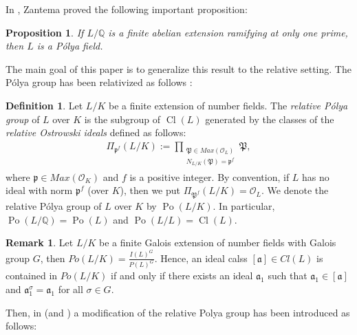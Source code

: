 \documentclass{amsart}
\newtheorem{proposition}[theorem]{Proposition}
\theoremstyle{definition}
\newtheorem{definition}[theorem]{Definition}
\newtheorem{remark}[theorem]{Remark}
\numberwithin{equation}{section}
\DeclareMathOperator{\Po}{Po}
\DeclareMathOperator{\Cl}{Cl}
\begin{document}
In \cite{Zantema}, Zantema proved the following important proposition:

\begin{proposition} \cite[Proposition $2.5$]{Zantema} \label{proposition, abelian extensions are Polya}
If $L/\mathbb{Q}$ is a finite abelian extension ramifying at only one prime, then $L$ is a P\'olya field.
\end{proposition}


The main goal of this paper is to generalize this result to the relative setting.
The P\'olya group has been relativized as follows \cite{ChabertI, MaarefparvarThesis}:

\begin{definition} \label{definition, relative Polya group} 
	Let $L/K$ be a finite extension of number fields. The \textit{relative P\'olya group} of $L$ over $K$ is the subgroup of $\Cl(L)$ generated by the classes of the \textit{relative Ostrowski ideals} defined as follows: 
	\begin{align} \label{equation, relative Ostrowski ideal}
		\Pi_{\mathfrak{p}^f}(L/K):=\prod_{\substack{\mathfrak{P}\in Max(\mathcal{O}_L) \\ N_{L/K}(\mathfrak{P})=\mathfrak{p}^f}} \mathfrak{P},
	\end{align}
	where $\mathfrak{p} \in Max(\mathcal{O}_K)$ and $f$ is a positive integer. By convention, if $L$ has no ideal with norm $\mathfrak{p}^f$ (over $K$), then we put $\Pi_{\mathfrak{P}^f}(L/K)=\mathcal{O}_L$.
	We denote the relative P\'olya group of $L$ over $K$ by $\Po(L/K)$. In particular, $\Po(L/\mathbb{Q})=\Po(L)$ and $\Po(L/L)=\Cl(L)$.
\end{definition}

\begin{remark} \label{remark, elements of relative Polya group}
Let $L/K$ be a finite Galois extension of number fields with Galois group $G$, then $Po(L/K)=\frac{I(L)^G}{P(L)^G}$. Hence, an ideal calss $[\mathfrak{a}] \in Cl(L)$ is contained in $Po(L/K)$ if and only if there exists an ideal $\mathfrak{a}_1$ such that $\mathfrak{a}_1 \in [\mathfrak{a}]$ and $\mathfrak{a}_1^{\sigma} = \mathfrak{a}_1$ for all $\sigma \in G$.
\end{remark}

Then, in \cite{Ehsan Thesis} (and \cite{SRM}) a modification of the relative Polya group has been introduced as follows:
\end{document}
